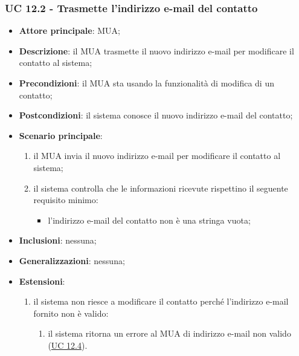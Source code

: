     \subsubsection{UC 12.2 - Trasmette l'indirizzo e-mail del contatto} \label{sec:UC12.2}
    \begin{itemize}
        \item \textbf{Attore principale}: MUA;
        \item \textbf{Descrizione}: il MUA trasmette il nuovo indirizzo e-mail per modificare il contatto al sistema;
        \item \textbf{Precondizioni}: il MUA sta usando la funzionalità di modifica di un contatto;
        \item \textbf{Postcondizioni}: il sistema conosce il nuovo indirizzo e-mail del contatto;
        \item \textbf{Scenario principale}:
            \begin{enumerate}
                \item il MUA invia il nuovo indirizzo e-mail per modificare il contatto al sistema;
                \item il sistema controlla che le informazioni ricevute rispettino il seguente requisito minimo:
                    \begin{itemize}
                        \item l'indirizzo e-mail del contatto non è una stringa vuota;
                    \end{itemize}
            \end{enumerate}
        \item \textbf{Inclusioni}: nessuna;
        \item \textbf{Generalizzazioni}: nessuna;
        \item \textbf{Estensioni}:
            \begin{enumerate}[label=\alph*.]
                \item il sistema non riesce a modificare il contatto perché l'indirizzo e-mail fornito non è valido:
                \begin{enumerate}[label=\arabic*.]
                    \item il sistema ritorna un errore al MUA di indirizzo e-mail non valido (\hyperref[sec:UC12.4]{UC 12.4}).
                \end{enumerate}
            \end{enumerate}
    \end{itemize}



